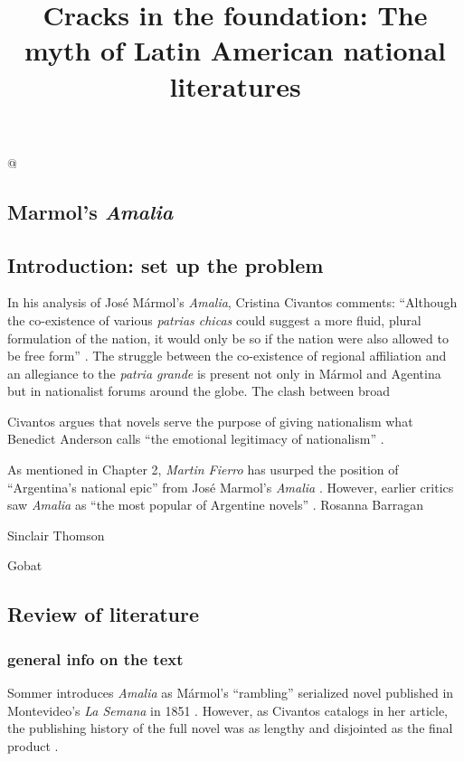 \documentclass[12pt]{report}
\title{Cracks in the foundation: The myth of Latin American national literatures}
\begin{document}


@

\begin{singlespace}

\chapter{Marmol's \textit{Amalia}}

\end{singlespace}

\section{Introduction: set up the problem}

In his analysis of José Mármol's \textit{Amalia}, Cristina Civantos comments: \enquote{Although the co-existence of various \textit{patrias chicas} could suggest a more fluid, plural formulation of the nation, it would only be so if the nation were also allowed to be free form} \autocite[67]{Civantos2000}. The struggle between the co-existence of regional affiliation and an allegiance to the \textit{patria grande} is present not only in Mármol and Agentina but in nationalist forums around the globe. The clash between broad 

Civantos argues that novels serve the purpose of giving nationalism what Benedict Anderson calls \enquote{the emotional legitimacy of nationalism} \autocite[Anderson in][69]{Civantos2000}.

As mentioned in Chapter 2, \textit{Martin Fierro} has usurped the position of \enquote{Argentina's national epic} from José Marmol's \textit{Amalia} \cite[111]{Sommer1991}.
However, earlier critics saw \textit{Amalia} as \enquote{the most popular of Argentine novels} \autocite{Leavitt1926}.
Rosanna Barragan

Sinclair Thomson

Gobat


\section{Review of literature}


\subsection{general info on the text}
Sommer introduces \textit{Amalia} as Mármol's \enquote{rambling} serialized novel published in Montevideo's \textit{La Semana} in 1851 \autocite[83]{Sommer1991}.
However, as Civantos catalogs in her article, the publishing history of the full novel was as lengthy and disjointed as the final product \autocite[74]{Civantos2000}. 
\end{document}
